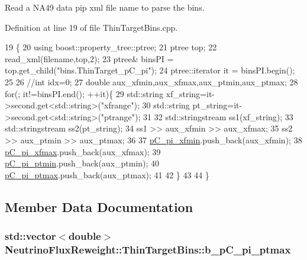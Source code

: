 Read a N\-A49 data pip xml file name to parse the bins. 



Definition at line 19 of file Thin\-Target\-Bins.\-cpp.


\begin{DoxyCode}
19                                                          \{
20     \textcolor{keyword}{using} boost::property\_tree::ptree;
21     ptree top;    
22     read\_xml(filename,top,2); 
23     ptree& binsPI = top.get\_child(\textcolor{stringliteral}{"bins.ThinTarget\_pC\_pi"}); 
24     ptree::iterator it = binsPI.begin();
25 
26     \textcolor{comment}{//int idx=0;}
27     \textcolor{keywordtype}{double} aux\_xfmin,aux\_xfmax,aux\_ptmin,aux\_ptmax;
28     \textcolor{keywordflow}{for}(; it!=binsPI.end(); ++it)\{
29       std::string xf\_string=it->second.get<std::string>(\textcolor{stringliteral}{"xfrange"});
30       std::string pt\_string=it->second.get<std::string>(\textcolor{stringliteral}{"ptrange"});
31       
32       std::stringstream ss1(xf\_string);
33       std::stringstream ss2(pt\_string);
34       ss1 >> aux\_xfmin >> aux\_xfmax;
35       ss2 >> aux\_ptmin >> aux\_ptmax;
36    
37       \hyperlink{class_neutrino_flux_reweight_1_1_thin_target_bins_a87af8428f4ca3ce237afedb5bce1e869}{pC\_pi\_xfmin}.push\_back(aux\_xfmin);
38       \hyperlink{class_neutrino_flux_reweight_1_1_thin_target_bins_a052a668add3b703e7be93e09b02e49c7}{pC\_pi\_xfmax}.push\_back(aux\_xfmax);
39       \hyperlink{class_neutrino_flux_reweight_1_1_thin_target_bins_aa64b0a70969bf8e75d8c5bb9b0c902dd}{pC\_pi\_ptmin}.push\_back(aux\_ptmin);
40       \hyperlink{class_neutrino_flux_reweight_1_1_thin_target_bins_a1e80cc8c9297c568dcf389a5ceb11e78}{pC\_pi\_ptmax}.push\_back(aux\_ptmax);
41       
42     \}
43     
44   \}
\end{DoxyCode}


\subsection{Member Data Documentation}
\hypertarget{class_neutrino_flux_reweight_1_1_thin_target_bins_afcd618199b5e49acb93782c67ff9d71e}{
\subsubsection[{b\-\_\-p\-C\-\_\-pi\-\_\-ptmax}]{\setlength{\rightskip}{0pt plus 5cm}std\-::vector$<$double$>$ Neutrino\-Flux\-Reweight\-::\-Thin\-Target\-Bins\-::b\-\_\-p\-C\-\_\-pi\-\_\-ptmax}}\label{class_neutrino_flux_reweight_1_1_thin_target_bins_afcd618199b5e49acb93782c67ff9d71e}


